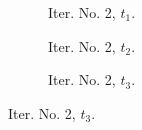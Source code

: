 \documentclass[a4paper,12pt]{amsart}
\numberwithin{equation}{section}
\begin{document}
\begin{figure}[h!]
\begin{subfigure}[t]{0.23\textwidth}
    \caption{Iter. No. 2, $t_1$.}
\end{subfigure}
	\hfill
\begin{subfigure}[t]{0.23\textwidth}
    \caption{Iter. No. 2, $t_2$.}
\end{subfigure}
	\hfill
\begin{subfigure}[t]{0.23\textwidth}
    \caption{Iter. No. 2, $t_3$.}
\end{subfigure}


\end{figure}
\end{document}
